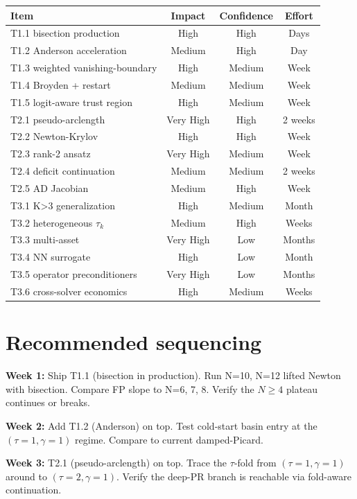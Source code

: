 \documentclass[11pt]{article}
\begin{document}
\begin{center}\begin{tabular}{lccc}\toprule
Item & Impact & Confidence & Effort \\\midrule
T1.1 bisection production & High & High & Days \\
T1.2 Anderson acceleration & Medium & High & Day \\
T1.3 weighted vanishing-boundary & High & Medium & Week \\
T1.4 Broyden + restart & Medium & Medium & Week \\
T1.5 logit-aware trust region & High & Medium & Week \\\midrule
T2.1 pseudo-arclength & Very High & High & 2 weeks \\
T2.2 Newton-Krylov & High & High & Week \\
T2.3 rank-2 ansatz & Very High & Medium & Week \\
T2.4 deficit continuation & Medium & Medium & 2 weeks \\
T2.5 AD Jacobian & Medium & High & Week \\\midrule
T3.1 K>3 generalization & High & Medium & Month \\
T3.2 heterogeneous $\tau_k$ & Medium & High & Weeks \\
T3.3 multi-asset & Very High & Low & Months \\
T3.4 NN surrogate & High & Low & Month \\
T3.5 operator preconditioners & Very High & Low & Months \\
T3.6 cross-solver economics & High & Medium & Weeks \\
\bottomrule\end{tabular}\end{center}

\section{Recommended sequencing}\label{sec:sequencing}

\textbf{Week 1:} Ship T1.1 (bisection in production). Run N=10, N=12 lifted Newton with
bisection. Compare FP slope to N=6, 7, 8. Verify the $N\ge 4$ plateau continues or breaks.

\textbf{Week 2:} Add T1.2 (Anderson) on top. Test cold-start basin entry at the
$(\tau{=}1,\gamma{=}1)$ regime. Compare to current damped-Picard.

\textbf{Week 3:} T2.1 (pseudo-arclength) on top. Trace the $\tau$-fold from
$(\tau{=}1,\gamma{=}1)$ around to $(\tau{=}2,\gamma{=}1)$. Verify the deep-PR branch is
reachable via fold-aware continuation.
\end{document}
